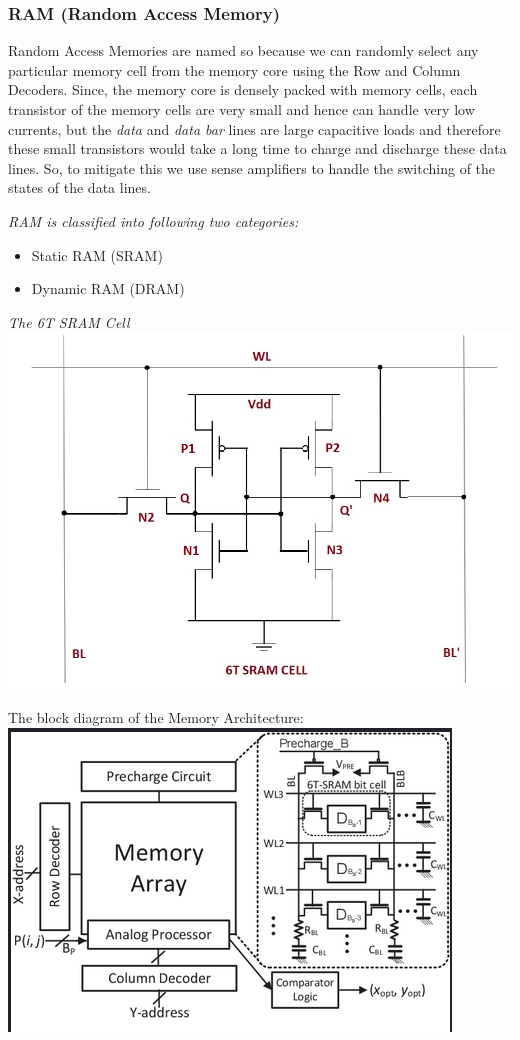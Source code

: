 \documentclass[12pt, letterpaper]{article}
\begin{document}
\subsubsection{RAM (Random Access Memory)}
Random Access Memories are named so because we can randomly select any particular memory cell from the memory core using the Row and Column Decoders.
Since, the memory core is densely packed with memory cells, each transistor of the memory cells are very small and hence can handle very low currents, but the \textit{data} and \textit{data bar} lines are large capacitive loads and therefore these small transistors would take a long time to charge and discharge these data lines. So, to mitigate this we use sense amplifiers to handle the switching of the states of the data lines.

\emph{RAM is classified into following two categories:}
\begin{itemize}
    \item Static RAM (SRAM)
    \item Dynamic RAM (DRAM)
\end{itemize}

\emph{The 6T SRAM Cell} \\
\includegraphics [scale=0.5]{sram-cell}

The block diagram of the Memory Architecture: \\
\includegraphics[scale=0.7]{det_mem_arch}

 
\end{document}
